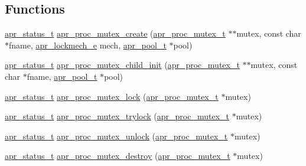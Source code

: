 \subsection*{Functions}
\begin{DoxyCompactItemize}
\item 
\hyperlink{group__apr__errno_gaf76ee4543247e9fb3f3546203e590a6c}{apr\-\_\-status\-\_\-t} \hyperlink{group__apr__proc__mutex_ga57a0ad8cc6209dcbc8cf7c4bdf4a2c22}{apr\-\_\-proc\-\_\-mutex\-\_\-create} (\hyperlink{group__apr__proc__mutex_ga0fae3a1ab686cd1f252c6062e4c97bd2}{apr\-\_\-proc\-\_\-mutex\-\_\-t} $\ast$$\ast$mutex, const char $\ast$fname, \hyperlink{group__apr__proc__mutex_ga75dd95a48a1e855a87b509b522746ed4}{apr\-\_\-lockmech\-\_\-e} mech, \hyperlink{group__apr__pools_gaf137f28edcf9a086cd6bc36c20d7cdfb}{apr\-\_\-pool\-\_\-t} $\ast$pool)
\item 
\hyperlink{group__apr__errno_gaf76ee4543247e9fb3f3546203e590a6c}{apr\-\_\-status\-\_\-t} \hyperlink{group__apr__proc__mutex_ga52c440b92eda07dc9c851a4e98f2ac83}{apr\-\_\-proc\-\_\-mutex\-\_\-child\-\_\-init} (\hyperlink{group__apr__proc__mutex_ga0fae3a1ab686cd1f252c6062e4c97bd2}{apr\-\_\-proc\-\_\-mutex\-\_\-t} $\ast$$\ast$mutex, const char $\ast$fname, \hyperlink{group__apr__pools_gaf137f28edcf9a086cd6bc36c20d7cdfb}{apr\-\_\-pool\-\_\-t} $\ast$pool)
\item 
\hyperlink{group__apr__errno_gaf76ee4543247e9fb3f3546203e590a6c}{apr\-\_\-status\-\_\-t} \hyperlink{group__apr__proc__mutex_ga9af7c9eabf4f99a5a33b41dc322af06f}{apr\-\_\-proc\-\_\-mutex\-\_\-lock} (\hyperlink{group__apr__proc__mutex_ga0fae3a1ab686cd1f252c6062e4c97bd2}{apr\-\_\-proc\-\_\-mutex\-\_\-t} $\ast$mutex)
\item 
\hyperlink{group__apr__errno_gaf76ee4543247e9fb3f3546203e590a6c}{apr\-\_\-status\-\_\-t} \hyperlink{group__apr__proc__mutex_ga7c41927ce5014374eb4fc66d410f9513}{apr\-\_\-proc\-\_\-mutex\-\_\-trylock} (\hyperlink{group__apr__proc__mutex_ga0fae3a1ab686cd1f252c6062e4c97bd2}{apr\-\_\-proc\-\_\-mutex\-\_\-t} $\ast$mutex)
\item 
\hyperlink{group__apr__errno_gaf76ee4543247e9fb3f3546203e590a6c}{apr\-\_\-status\-\_\-t} \hyperlink{group__apr__proc__mutex_ga4ecd9a73fbb0e6e6853e5d0769bbb183}{apr\-\_\-proc\-\_\-mutex\-\_\-unlock} (\hyperlink{group__apr__proc__mutex_ga0fae3a1ab686cd1f252c6062e4c97bd2}{apr\-\_\-proc\-\_\-mutex\-\_\-t} $\ast$mutex)
\item 
\hyperlink{group__apr__errno_gaf76ee4543247e9fb3f3546203e590a6c}{apr\-\_\-status\-\_\-t} \hyperlink{group__apr__proc__mutex_gaa692ccd799305e0166fb81f258870830}{apr\-\_\-proc\-\_\-mutex\-\_\-destroy} (\hyperlink{group__apr__proc__mutex_ga0fae3a1ab686cd1f252c6062e4c97bd2}{apr\-\_\-proc\-\_\-mutex\-\_\-t} $\ast$mutex)

\end{DoxyCompactItemize}
